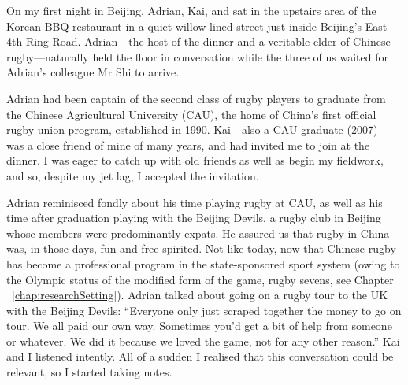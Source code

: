                                           \begin{CJK}{UTF8}{gbsn}



On my first night in Beijing, Adrian, Kai, and sat in the upstairs area of the Korean BBQ restaurant in a quiet willow lined street just inside Beijing's East 4th Ring Road.  Adrian---the host of the dinner and a veritable elder of Chinese rugby---naturally held the floor in conversation while the three of us waited for Adrian's colleague Mr Shi to arrive.

Adrian had been captain of the second class of rugby players to graduate from the Chinese Agricultural University (CAU), the home of China's first official rugby union program, established in 1990. Kai---also a CAU graduate (2007)---was a close friend of mine of many years, and had invited me to join at the dinner.  I was eager to catch up with old friends as well as begin my fieldwork, and so, despite my jet lag, I accepted the invitation.

Adrian reminisced fondly about his time playing rugby at CAU, as well as his time after graduation playing with the Beijing Devils, a rugby club in Beijing whose members were predominantly expats.  He assured us that rugby in China was, in those days, fun and free-spirited.  Not like today, now that Chinese rugby has become a professional program in the state-sponsored sport system (owing to the Olympic status of the modified form of the game, rugby sevens, see Chapter ~\ref{chap:researchSetting}).  Adrian talked about going on a rugby tour to the UK with the Beijing Devils:  ``Everyone only just scraped together the money to go on tour.  We all paid our own way. Sometimes you'd get a bit of help from someone or whatever. We did it because we loved the game, not for any other reason.''   Kai and I listened intently.  All of a sudden I realised that this conversation could be relevant, so I started taking notes.


\end{CJK}
